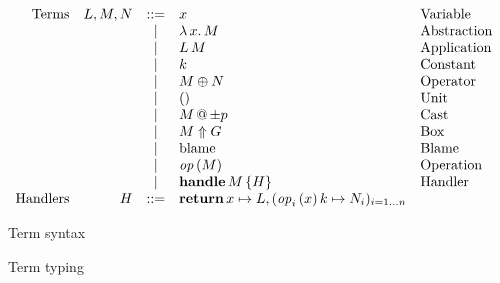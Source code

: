 \begin{figure}
$$
\begin{array}{rrcll}
 \text{Terms} &
 L, M, N & \ruledef & x & \text{Variable} \\
        && \rulealt & \lam{x}{M} & \text{Abstraction} \\
        && \rulealt & \app{L}{M} & \text{Application} \\
        && \rulealt & k & \text{Constant} \\
        && \rulealt & M \oplus N & \text{Operator} \\
        && \rulealt & () & \text{Unit} \\
        && \rulealt & \cast{M}{{\pm p}} & \text{Cast} \\
        && \rulealt & \tbox{M}{G} & \text{Box} \\
        && \rulealt & \blame & \text{Blame} \\
        && \rulealt & \perform{\effop}{M} & \text{Operation} \\
        && \rulealt & \handle{H}{M} & \text{Handler} \\
 \text{Handlers} &
 H & \ruledef & \treturn{x} \mapsto L, \fori{i}{n}{\perform{\effop_i}{x} k \mapsto N_i} &
\end{array}
$$
\caption{Term syntax}
\label{fig:term-syntax}
\end{figure}

\begin{figure}
\begin{prooftree}
\end{prooftree}
\begin{prooftree}
\end{prooftree}
\begin{prooftree}
\end{prooftree}
\begin{prooftree}
\end{prooftree}
\caption{Term typing}
\label{fig:term-typing}
\end{figure}

